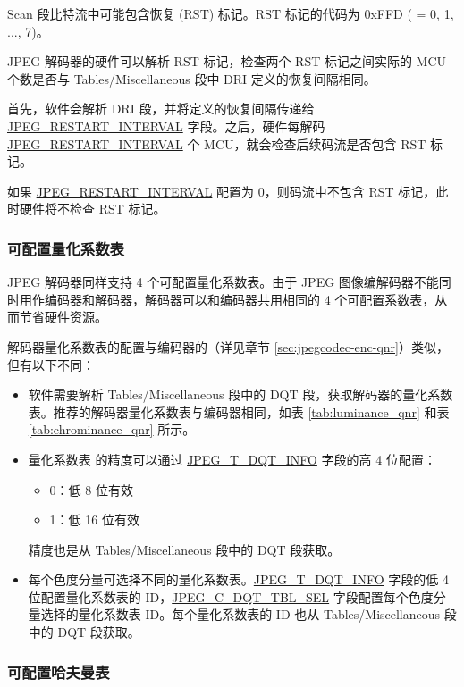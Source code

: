 \documentclass[main\_\_CN.tex]{subfiles}
\begin{document}
Scan 段比特流中可能包含恢复 (RST) 标记。RST 标记的代码为 0xFFD ( = 0, 1, ..., 7)。

JPEG 解码器的硬件可以解析 RST 标记，检查两个 RST 标记之间实际的 MCU 个数是否与 Tables/Miscellaneous 段中 DRI 定义的恢复间隔相同。

首先，软件会解析 DRI 段，并将定义的恢复间隔传递给 \hyperref[fielddesc:JPEGRESTARTINTERVAL]{JPEG\_RESTART\_INTERVAL} 字段。之后，硬件每解码 \hyperref[fielddesc:JPEGRESTARTINTERVAL]{JPEG\_RESTART\_INTERVAL} 个 MCU，就会检查后续码流是否包含 RST 标记。

如果 \hyperref[fielddesc:JPEGRESTARTINTERVAL]{JPEG\_RESTART\_INTERVAL} 配置为 0，则码流中不包含 RST 标记，此时硬件将不检查 RST 标记。

\subsubsection{可配置量化系数表}
\label{sec:jpegcodec-dec-qnr}

\chipname{} JPEG 解码器同样支持 4 个可配置量化系数表。由于 JPEG 图像编解码器不能同时用作编码器和解码器，解码器可以和编码器共用相同的 4 个可配置系数表，从而节省硬件资源。

解码器量化系数表的配置与编码器的（详见章节 \ref{sec:jpegcodec-enc-qnr}）类似，但有以下不同：
\begin{itemize}
    \item 软件需要解析 Tables/Miscellaneous 段中的 DQT 段，获取解码器的量化系数表。推荐的解码器量化系数表与编码器相同，如表 \ref{tab:luminance_qnr} 和表 \ref{tab:chrominance_qnr} 所示。
    \item 量化系数表 的精度可以通过 \hyperref[regdesc:JPEGDQTINFOREG]{JPEG\_T\_DQT\_INFO} 字段的高 4 位配置：
    \begin{itemize}
        \item 0：低 8 位有效
        \item 1：低 16 位有效
    \end{itemize}
    精度也是从 Tables/Miscellaneous 段中的 DQT 段获取。
    \item 每个色度分量可选择不同的量化系数表。\hyperref[regdesc:JPEGDQTINFOREG]{JPEG\_T\_DQT\_INFO} 字段的低 4 位配置量化系数表的 ID，\hyperref[fielddesc:JPEGC0DQTTBLSEL]{JPEG\_C\_DQT\_TBL\_SEL} 字段配置每个色度分量选择的量化系数表 ID。每个量化系数表的 ID 也从 Tables/Miscellaneous 段中的 DQT 段获取。
\end{itemize}

\subsubsection{可配置哈夫曼表}
\label{sec:jpegcodec-dec-huffman}
\end{document}
